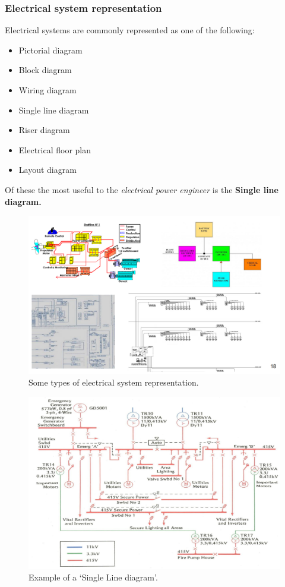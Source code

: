 \documentclass[class=report, crop=false, 12pt,a4paper]{standalone}
\begin{document}
\subsubsection{Electrical system representation}
Electrical systems are commonly represented as one of the following:
\begin{itemize}
	\item Pictorial diagram 
	\item Block diagram
	\item Wiring diagram
	\item Single line diagram
	\item Riser diagram
	\item Electrical floor plan
	\item Layout diagram
\end{itemize}
Of these the most useful to the \textit{electrical power engineer} is the \textbf{Single line diagram.}
\begin{figure}[H]
	\centering
	\includegraphics[width = \textwidth]{../img/figure1.png}
	\caption{Some types of electrical system representation.}
\end{figure}
\begin{figure}[H]
	\centering
	\includegraphics[width = \textwidth]{../img/figure2.png}
	\caption{Example of a `Single Line diagram'.}
\end{figure}
\end{document}
